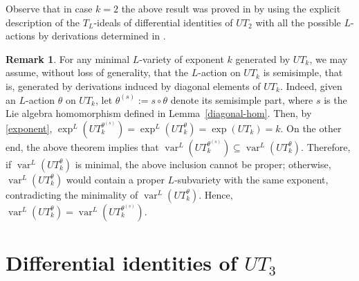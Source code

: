 \documentclass[a4paper,reqno]{amsart}
\theoremstyle{definition}
\newtheorem{remark}[theorem]{Remark}
\numberwithin{equation}{section}
\numberwithin{theorem}{section}
\DeclareMathOperator{\V}{var}
\begin{document}
Observe that in case $k=2$ the above result was proved in \cite[Corollary 4.5]{Rizzo2023} by using the explicit description of the $T_L$-ideals of differential identities of $UT_2$ with all the possible $L$-actions by derivations determined in \cite{GiambrunoRizzo2019, Rizzo2021}. 

\begin{remark}\label{rmk: semisimple action}
For any minimal $L$-variety of exponent $k$ generated by $UT_k$, we may assume, without loss of generality, that the $L$-action on $UT_k$ is semisimple, that is, generated by derivations induced by diagonal elements of $UT_k$.
   Indeed, given an $L$-action $\theta$ on $UT_k$, let $\theta^{(s)}:=s\circ\theta$ denote its semisimple part, where $s$ is the Lie algebra homomorphism defined in Lemma~\ref{diagonal-hom}. Then, by \eqref{exponent},
$\exp^L(UT_k^{\theta^{(s)}})=\exp^L(UT_k^\theta)=\exp(UT_k)=k$. On the other end, 
the above theorem implies that $\V^L(UT_k^{\theta^{(s)}})\subseteq\V^L(UT_k^\theta).$ 
Therefore, if $\V^L(UT_k^\theta)$ is minimal, the above inclusion cannot be proper; otherwise, $\V^L(UT_k^\theta)$ would contain a proper $L$-subvariety with the same exponent, contradicting the minimality of $\V^L(UT_k^\theta)$. Hence,
$\V^L(UT_k^\theta)=\V^L(UT_k^{\theta^{(s)}})$. 
\end{remark}




\section{Differential identities of $UT_3$}
\end{document}
